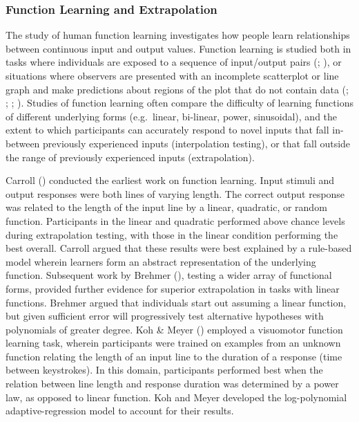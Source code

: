 \documentclass[
  11pt,
  letterpaper,
]{article}
\begin{document}
\subsubsection{Function Learning and
Extrapolation}\label{function-learning-and-extrapolation}

The study of human function learning investigates how people learn
relationships between continuous input and output values. Function
learning is studied both in tasks where individuals are exposed to a
sequence of input/output pairs
(;
),
or situations where observers are presented with an incomplete
scatterplot or line graph and make predictions about regions of the plot
that do not contain data
(;
;
;
). Studies of function learning often compare the difficulty
of learning functions of different underlying forms (e.g.~linear,
bi-linear, power, sinusoidal), and the extent to which participants can
accurately respond to novel inputs that fall in-between previously
experienced inputs (interpolation testing), or that fall outside the
range of previously experienced inputs (extrapolation).

Carroll ()
conducted the earliest work on function learning. Input stimuli and
output responses were both lines of varying length. The correct output
response was related to the length of the input line by a linear,
quadratic, or random function. Participants in the linear and quadratic
performed above chance levels during extrapolation testing, with those
in the linear condition performing the best overall. Carroll argued that
these results were best explained by a rule-based model wherein learners
form an abstract representation of the underlying function. Subsequent
work by Brehmer
(), testing a
wider array of functional forms, provided further evidence for superior
extrapolation in tasks with linear functions. Brehmer argued that
individuals start out assuming a linear function, but given sufficient
error will progressively test alternative hypotheses with polynomials of
greater degree. Koh \& Meyer
() employed a
visuomotor function learning task, wherein participants were trained on
examples from an unknown function relating the length of an input line
to the duration of a response (time between keystrokes). In this domain,
participants performed best when the relation between line length and
response duration was determined by a power law, as opposed to linear
function. Koh and Meyer developed the log-polynomial adaptive-regression
model to account for their results.
\end{document}
